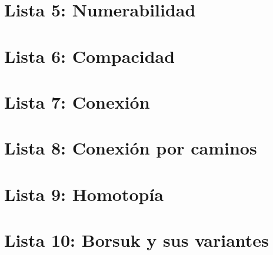 \documentclass[10pt,a4paper,openright]{book}
\theoremstyle{break}
\begin{document}
\chapter{Lista 5: Numerabilidad}%
\label{cha:lista5}

\chapter{Lista 6: Compacidad}%
\label{cha:lista6}

\chapter{Lista 7: Conexión}%
\label{cha:lista7}

\chapter{Lista 8: Conexión por caminos}%
\label{cha:lista8}

\chapter{Lista 9: Homotopía}%
\label{cha:lista9}

\chapter{Lista 10: Borsuk y sus variantes}%
\label{cha:lista10}
\end{document}
